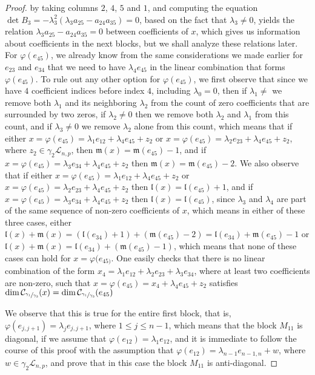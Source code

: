 \documentclass[12pt]{article}
\begin{document}
\begin{proof}
by taking columns $2$, $4$, $5$ and $1$, and computing the equation $\det B_3=-\lambda_3^2(\lambda_3 a_{25}-a_{24}a_{35})=0$, based on the fact that $\lambda_3\neq 0$, yields the relation $\lambda_3 a_{25}-a_{24}a_{35}=0$ between coefficients of $x$, which gives us information about coefficients in the next blocks, but we shall analyze these relations later. For $\varphi(e_{45})$, we already know from the same considerations we made earlier for $e_{23}$ and $e_{34}$ that we need to have $\lambda_4 e_{45}$ in the linear combination that forms $\varphi(e_{45})$. To rule out any other option for $\varphi(e_{45})$, we first observe that since we have $4$ coefficient indices before index $4$, including $\lambda_0=0$, then if $\lambda_1\neq$ we remove both $\lambda_1$ and its neighboring $\lambda_2$ from the count of zero coefficients that are surrounded by two zeros, if $\lambda_2\neq 0$ then we remove both $\lambda_2$ and $\lambda_1$ from this count, and if $\lambda_3\neq 0$ we remove $\lambda_2$ alone from this count, which means that if either $x=\varphi(e_{45})=\lambda_1 e_{12}+\lambda_4 e_{45}+z_2$ or $x=\varphi(e_{45})=\lambda_2 e_{23}+\lambda_4 e_{45}+z_2$, where $z_2\in\gamma_2\mathcal{L}_{n,p}$, then $\mathfrak{m}(x)=\mathfrak{m}(e_{45})-1$, and if $x=\varphi(e_{45})=\lambda_3 e_{34}+\lambda_4 e_{45}+z_2$ then $\mathfrak{m}(x)=\mathfrak{m}(e_{45})-2$. We also observe that if either $x=\varphi(e_{45})=\lambda_1 e_{12}+\lambda_4 e_{45}+z_2$ or $x=\varphi(e_{45})=\lambda_2 e_{23}+\lambda_4 e_{45}+z_2$ then $\mathfrak{l}(x)=\mathfrak{l}(e_{45})+1$, and if $x=\varphi(e_{45})=\lambda_3 e_{34}+\lambda_4 e_{45}+z_2$ then $\mathfrak{l}(x)=\mathfrak{l}(e_{45})$, since $\lambda_3$ and $\lambda_4$ are part of the same sequence of non-zero coefficients of $x$, which means in either of these three cases, either $\mathfrak{l}(x)+\mathfrak{m}(x)=(\mathfrak{l}(e_{34})+1)+(\mathfrak{m}(e_{45})-2)=\mathfrak{l}(e_{34})+\mathfrak{m}(e_{45})-1$ or $\mathfrak{l}(x)+\mathfrak{m}(x)=\mathfrak{l}(e_{34})+(\mathfrak{m}(e_{45})-1)$, which means that none of these cases can hold for $x=\varphi(e_{45)}$. One easily checks that there is no linear combination of the form $x_4=\lambda_1 e_{12}+\lambda_2 e_{23}+\lambda_3 e_{34}$, where at least two coefficients are non-zero, such that $x=\varphi(e_{45})=x_4+\lambda_4 e_{45}+z_2$ satisfies $\dim\mathcal{C}_{\sfrac{\gamma_1}{\gamma_3}}(x)=\dim\mathcal{C}_{\sfrac{\gamma_1}{\gamma_3}}(e_{45})$



We observe that this is true for the entire first block, that is, $\varphi(e_{j,j+1})=\lambda_j e_{j,j+1}$, where $1\leq j\leq n-1$, which means that the block $M_{11}$ is diagonal, if we assume that $\varphi(e_{12})=\lambda_1 e_{12}$, and it is immediate to follow the course of this proof with the assumption that $\varphi(e_{12})=\lambda_{n-1}e_{n-1,n}+w$, where $w\in\gamma_2\mathcal{L}_{n,p}$, and prove that in this case the block $M_{11}$ is anti-diagonal.
\end{proof}
\end{document}
